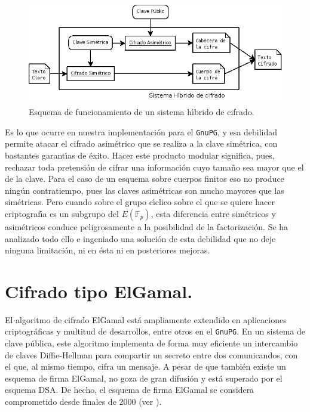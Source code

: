 \documentclass{cedi}%
\def\cfs{cuerpos finitos}%
\newcommand{\EFp}{\ensuremath{E(\mathbb{F}_p)}}%
\theoremstyle{plain}        			%
\theoremstyle{definition}   			%
\theoremstyle{saltolinea}   			%
\begin{document}
\begin{figure}\begin{center}
\includegraphics[scale=0.3,clip]{./imgs/sis_hibrido.png}
\caption{Esquema de funcionamiento de un sistema h\'{\i}brido de cifrado.}\label{hibrido}
\end{center}\end{figure}

Es lo que ocurre en nuestra implementaci\'on para el \texttt{GnuPG}, y esa debilidad permite atacar el cifrado asim\'etrico que se realiza a la clave sim\'etrica, con bastantes garant\'{\i}as de \'exito. Hacer este producto modular significa, pues, rechazar toda pretensi\'on de cifrar una informaci\'on cuyo tama\~no sea mayor que el de la clave. Para el caso de un esquema sobre \cfs{} eso no produce ning\'un contratiempo, pues las claves asim\'etricas son mucho mayores que las sim\'etricas. Pero cuando sobre el grupo c\'{\i}clico sobre el que se quiere hacer criptograf\'{\i}a es un subgrupo del $\EFp$, esta diferencia entre sim\'etricos y asim\'etricos conduce peligrosamente a la posibilidad de la factorizaci\'on. Se ha analizado todo ello e ingeniado una soluci\'on de esta debilidad que no deje ninguna limitaci\'on, ni en \'esta ni en posteriores mejoras.

\section{Cifrado tipo ElGamal.} %

El algoritmo de cifrado ElGamal est\'a ampliamente extendido en aplicaciones criptogr\'aficas y multitud de desarrollos, entre otros en el \texttt{GnuPG}. En un sistema de clave p\'ublica, este algoritmo implementa de forma muy eficiente un intercambio de claves Diffie-Hellman para compartir un secreto entre dos comunicandos, con el que, al mismo tiempo, cifra un mensaje. A pesar de que tambi\'en existe un esquema de firma ElGamal, no goza de gran difusi\'on y est\'a superado por el esquema DSA. De hecho, el esquema de firma ElGamal se considera comprometido desde finales de 2000 (ver \cite{insecure}).
\end{document}
